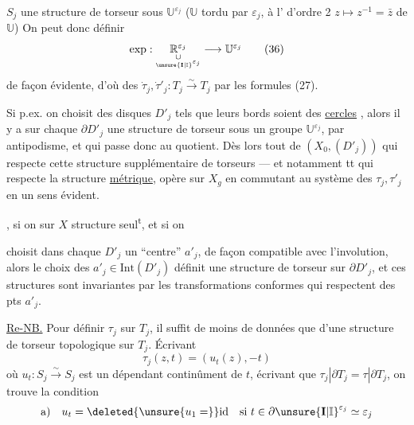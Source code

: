 
$S_j$ une structure de torseur sous $\mathbb U^{\varepsilon_j}$
($\mathbb U$ tordu par $\varepsilon_j$,  à l' d'ordre 2
$z\longmapsto z^{-1}=\bar z$ de $\mathbb U$) On peut donc définir
\[
\exp:\underset{\underset{\unsure{\mathbf I|\mathbb I}^{\varepsilon_j}}{\cup}}{\mathbb R^{\varepsilon_j}}
\longrightarrow\mathbb U^{\varepsilon_j}
\tag{36}
\]
de façon évidente, d'où des 
$\dot\tau_j,\dot\tau'_j:T_j\xrightarrow{\sim}T_j$ par les formules (27).

Si p.ex. on choisit des disques $D'_j$ tels que leurs bords soient des \uline{cercles}
, alors il y a sur chaque  $\partial D'_j$
une structure de torseur sous un groupe $\mathbb U^{\varepsilon_j}$,
 par antipodisme, et qui passe donc au quotient.
Dès lors tout  de $(X_0,(D'_j))$ qui respecte cette
structure supplémentaire de torseurs --- et notamment tt  qui respecte
la structure \uline{métrique},  opère sur $X_g$ en commutant
au système des $\tau_j,\tau'_j$ en un sens évident.

, si on   sur $X$
 structure \uline{} seul\textsuperscript{t}, et si on


choisit dans chaque $D'_j$ un ``centre'' $a'_j$, de façon compatible avec l'involution,
alors le choix des $a'_j\in\mathrm{Int}(D'_j)$ définit une structure de torseur sur
$\partial D'_j$\unsure{\textsuperscript{*}}, et ces structures sont invariantes par les
transformations conformes qui respectent  des pts $a'_j$.


\uline{Re-NB.} Pour définir $\tau_j$ sur $T_j$, il suffit de 
moins de données que d'une structure de torseur topologique sur $T_j$.
Écrivant 
\[
\tau_j(z,t)=(u_t(z),-t)
\tag{37}
\]
où $u_t:S_j\xrightarrow{\sim}S_j$ est un  dépendant continûment de $t$,
écrivant que $\tau_j|\partial T_j=\tau|\partial T_j$, on trouve la condition
\[
\text{a)}\quad u_t=\deleted{\unsure{u_1=}}\mathrm{id}
\quad\text{si }t\in\partial\unsure{\mathbf I|\mathbb I}^{\varepsilon_j}\simeq\varepsilon_j
\]

